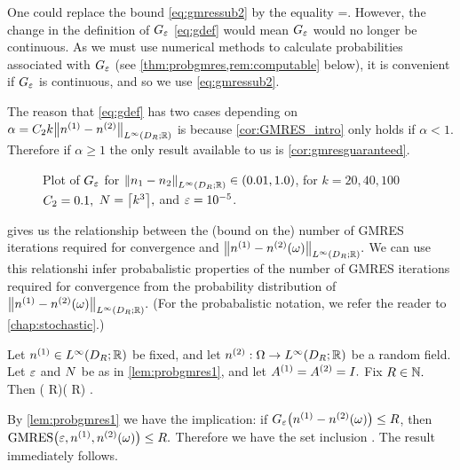 One could replace the bound \cref{eq:gmressub2} by the equality
\beqs
\ms  =.
\eeqs
However, the change in the definition of $G_{\varepsilon}$ \cref{eq:gdef} would mean $G_{\varepsilon}$ would no longer be continuous. As we must use numerical methods to calculate probabilities associated with $G_{\varepsilon}$ (see \cref{thm:probgmres,rem:computable} below), it is convenient if $G_{\varepsilon}$ is continuous, and so we use \cref{eq:gmressub2}.
\ere

The reason that \cref{eq:gdef} has two cases depending on $\alpha = \Ct k \NLiDRRR{\nso-\nst}$ is because \cref{cor:GMRES_intro} only holds if $\alpha < 1$. Therefore if $\alpha \geq 1$ the only result available to us is \cref{cor:gmresguaranteed}.
\ere

\begin{figure}
  \centering
  
  \caption{Plot of $G_{\varepsilon}$ for $\NLiDRRR{\no-\nt} \in \mleft(0.01,1.0\mright)$, for $k=20,40,100$ $C_{2} = 0.1,$ $N=\ceil{k^3},$ and $\varepsilon = 10^{-5}$.\label{fig:G}}
    \end{figure}


 gives us the relationship between the (bound on the) number of GMRES iterations required for convergence and $\NLiDRRR{\nso-\nst(\omega)}.$ We can use this relationshi infer probabalistic properties of the number of GMRES iterations required for convergence from the probability distribution of $\NLiDRRR{\nso-\nst(\omega)}.$ (For the probabalistic notation, we refer the reader to \cref{chap:stochastic}.)

\label{thm:probgmres}
Let $\nso \in \LiDRRR$ be fixed, and let $\nst:\Omega\rightarrow\LiDRRR$ be a random field. Let $\varepsilon$ and $N$ be as in \cref{lem:probgmres1}, and let ${A}^{(1)} = {A}^{(2)} = I.$ Fix $ R \in \mathbb N.$ Then
\beq\label{eq:GMRESprob}
\PP\mleft(\Gfn{\NLiDRRR{\nso-\nst}} \leq R\mright)\leq\PP\mleft(\GMRES{\eps}{\nso}{\nst} \leq R\mright) .
\eeq
\enth

By \cref{lem:probgmres1} we have the implication: if $\Gfn{\nso-\nst(\omega)} \leq R$, then $\GMRES{\eps}{\nso}{\nst(\omega)} \leq R.$ Therefore we have the set inclusion
\beqs
{} \subseteq {}.
\eeqs
The result immediately follows.
\epf

